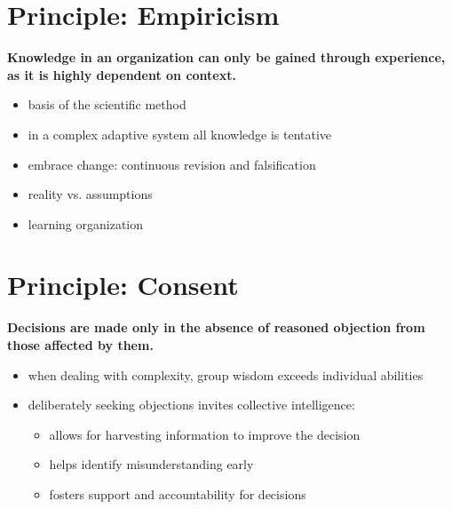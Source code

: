 \section{Principle: Empiricism}
\label{principle:empiricism}

\textbf{Knowledge in an organization can only be gained through experience, as it is highly dependent on context.}

\begin{itemize}
\item basis of the scientific method

\item in a complex adaptive system all knowledge is tentative

\item embrace change: continuous revision and falsification

\item reality vs. assumptions

\item learning organization

\end{itemize}

\section{Principle: Consent}
\label{principle:consent}

\textbf{Decisions are made only in the absence of reasoned objection from those affected by them.}

\begin{itemize}
\item when dealing with complexity, group wisdom exceeds individual abilities

\item deliberately seeking objections invites collective intelligence:

\begin{itemize}
\item allows for harvesting information to improve the decision

\item helps identify misunderstanding early

\item fosters support and accountability for decisions

\end{itemize}

\end{itemize}

